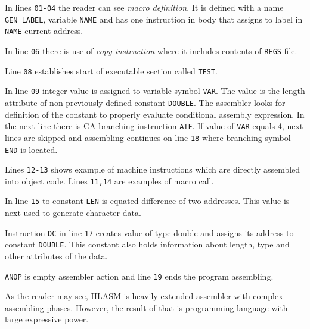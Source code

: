In lines \verb|01-04| the reader can see \textit{macro definition}. It is defined with a name \verb|GEN_LABEL|, variable \verb|NAME| and has one instruction in body that assigns to label in \verb|NAME| current address.

In line \verb|06| there is use of \textit{copy instruction} where it includes contents of \verb|REGS| file.

Line \verb|08| establishes start of executable section called \verb|TEST|. 

In line \verb|09| integer value is assigned to variable symbol \verb|VAR|. The value is the length attribute of non previously defined constant \verb|DOUBLE|. The assembler looks for definition of the constant to properly evaluate conditional assembly expression. In the next line there is CA branching instruction \verb|AIF|. If value of \verb|VAR| equals 4, next lines are skipped and assembling continues on line \verb|18| where branching symbol \verb|END| is located.  

Lines \verb|12-13| shows example of machine instructions which are directly assembled into object code. Lines \verb|11,14| are examples of macro call.

In line \verb|15| to constant \verb|LEN| is equated difference of two addresses. This value is next used to generate character data.

Instruction \verb|DC| in line \verb|17| creates value of type double and assigns its address to constant \verb|DOUBLE|. This constant also holds information about length, type and other attributes of the data.  

\verb|ANOP| is empty assembler action and line \verb|19| ends the program assembling. 

\vspace{5mm}
As the reader may see, HLASM is heavily extended assembler with complex assembling phases. 
However, the result of that is programming language with large expressive power. 